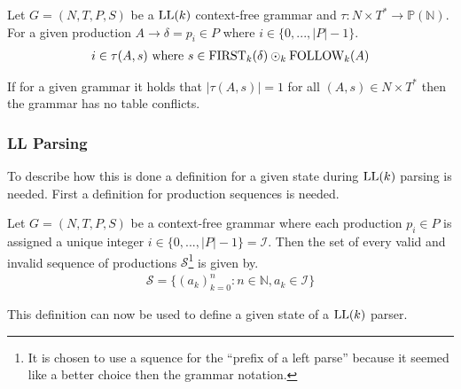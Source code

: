 \begin{definition}[$\LL(k)$ table]
    Let $G = (N, T, P, S)$ be a $\LL(k)$ context-free grammar and $\tau : N \times T^* \to \mathbb{P}(\mathbb{N})$. For a given production $A \to \delta = p_i \in P$ where $i \in \{0, ..., |P| - 1\}$.
    \begin{gather*}
        i \in \tau(A, s) \text{ where } s \in \text{FIRST}_k(\delta) \odot_k \text{FOLLOW}_k(A)
    \end{gather*}
\end{definition}
\noindent If for a given grammar it holds that $|\tau(A, s)| = 1$ for all $(A, s) \in N \times T^*$ then the grammar has no table conflicts.

\subsubsection{LL Parsing}
To describe how this is done a definition for a given state during $\LL(k)$ parsing is needed. First a definition for production sequences is needed.

\begin{definition}
    \label{def:production-sequence}
    Let $G = (N, T, P, S)$ be a context-free grammar where each production $p_i \in P$ is assigned a unique integer $i \in \{0, ..., |P| - 1\} = \mathcal{I}$. Then the set of every valid and invalid sequence of productions $\mathcal{S}$\footnote{It is chosen to use a squence for the ``prefix of  a left parse'' \cite[5]{Vagner2007} because it seemed like a better choice then the grammar notation.} is given by.
    \begin{align*}
        \mathcal{S} = \{(a_k)_{k=0}^n : n \in \mathbb{N}, a_k \in \mathcal{I}\}
    \end{align*}
\end{definition}
\noindent This definition can now be used to define a given state of a $\LL(k)$ parser. 

